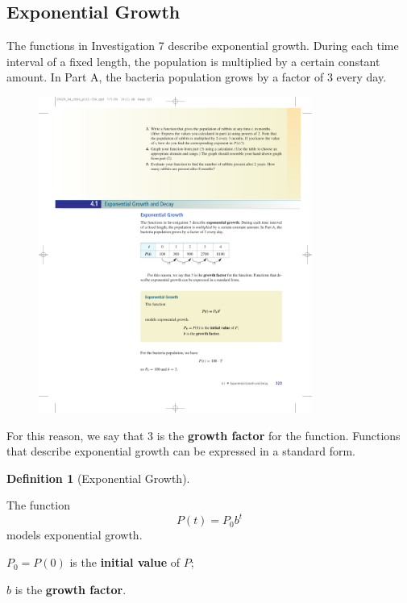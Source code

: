 \documentclass[10pt,]{book}
\newcommand{\terminology}[1]{\textbf{#1}}
\theoremstyle{plain}
\theoremstyle{definition}
\newtheorem{definition}[theorem]{Definition}
\theoremstyle{definition}
\theoremstyle{definition}
\theoremstyle{definition}
\theoremstyle{definition}
\numberwithin{equation}{section}
\begin{document}
\subsection[Exponential Growth]{Exponential Growth}\label{subsection-85}

    The functions in Investigation 7 describe exponential growth. During each time interval of a fixed length, the population is multiplied by a certain constant amount. In Part A, the bacteria population grows by a factor of \(3\) every day.
%
\leavevmode%
\begin{figure}
\centering
\includegraphics[width=0.80\textwidth,]{images/fig-table-bacteria-population.pdf}\end{figure}
\par

    For this reason, we say that \(3\) is the \terminology{growth factor} for the function. Functions that describe exponential growth can be expressed in a standard form.
%
\begin{definition}[Exponential Growth]\label{definition-7}
%
\par

    The function
    \begin{equation*}P(t) = P_0 b^t\end{equation*}
    models exponential growth.
%
\par

    \(P_0 = P(0)\) is the \terminology{initial value} of \(P\);
%
\par

    \(b\) is the \terminology{growth factor}.
%
\end{definition}
\par
\end{document}
